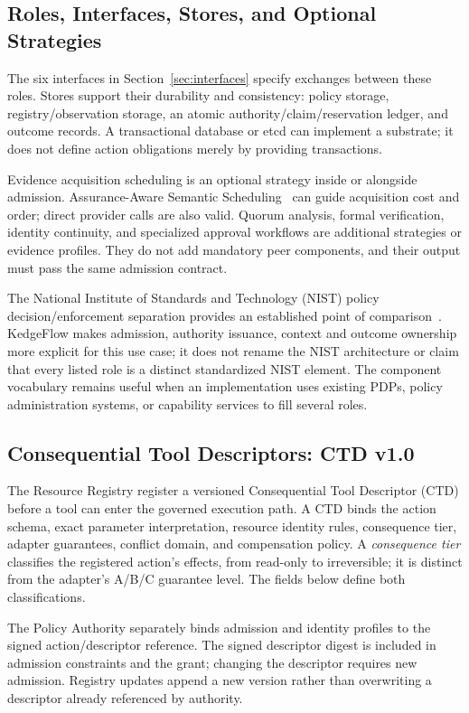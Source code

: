 \subsection{Roles, Interfaces, Stores, and Optional Strategies}
The six interfaces in Section~\ref{sec:interfaces} specify exchanges between these roles. Stores support their durability and consistency: policy storage, registry/observation storage, an atomic authority/claim/reservation ledger, and outcome records. A transactional database or etcd can implement a substrate; it does not define action obligations merely by providing transactions.

Evidence acquisition scheduling is an optional strategy inside or alongside admission. Assurance-Aware Semantic Scheduling~\cite{he2026aas} can guide acquisition cost and order; direct provider calls are also valid. Quorum analysis, formal verification, identity continuity, and specialized approval workflows are additional strategies or evidence profiles. They do not add mandatory peer components, and their output must pass the same admission contract.

The National Institute of Standards and Technology (NIST) policy decision/enforcement separation provides an established point of comparison~\cite{nist800207}. KedgeFlow makes admission, authority issuance, context and outcome ownership more explicit for this use case; it does not rename the NIST architecture or claim that every listed role is a distinct standardized NIST element. The component vocabulary remains useful when an implementation uses existing PDPs, policy administration systems, or capability services to fill several roles.

\subsection{Consequential Tool Descriptors: CTD v1.0}
\label{sec:ctd}
The Resource Registry  register a versioned Consequential Tool Descriptor (CTD) before a tool can enter the governed execution path. A CTD binds the action schema, exact parameter interpretation, resource identity rules, consequence tier, adapter guarantees, conflict domain, and compensation policy. A \emph{consequence tier} classifies the registered action's effects, from read-only to irreversible; it is distinct from the adapter's A/B/C guarantee level. The fields below define both classifications.

The Policy Authority separately binds admission and identity profiles to the signed action/descriptor reference. The signed descriptor digest is included in admission constraints and the grant; changing the descriptor requires new admission. Registry updates append a new version rather than overwriting a descriptor already referenced by authority.

